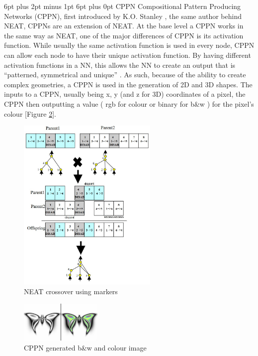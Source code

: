 \documentclass[12pt,a4paper]{article}
\makeatletter
\renewcommand\subsection{\@startsection {subsection}{1}{2mm} %
                               {6pt plus 2pt minus 1pt} %
                               {6pt plus 0pt} %
                               {\normalfont\bfseries}}
\makeatother
\begin{document}
\subsection{CPPN}
Compositional Pattern Producing Networks (CPPN), first introduced by K.O. Stanley \cite{stanley_compositional_2007}, the same author behind NEAT, CPPNs are an extension of NEAT. At the base level a CPPN works in the same way as NEAT, one of the major differences of CPPN is its activation function. While usually the same activation function is used in every node, CPPN can allow each node to have their unique activation function. By having different activation functions in a NN, this allows the NN to create an output that is “patterned, symmetrical and unique” \cite{wolfe_understanding_2018}. As such, because of the ability to create complex geometries, a CPPN is used in the generation of 2D and 3D shapes. The inputs to a CPPN, usually being x, y (and z for 3D) coordinates of a pixel, the CPPN then outputting a value (  rgb for colour or binary for b\&w ) for the pixel’s colour [Figure \ref{fig:7}].\par
\begin{figure}[h]
	\includegraphics[width=0.6\textwidth]{neat2}
	\centering
	\caption{NEAT crossover using markers \protect \cite{stanley_evolving_2002}}
	\label{fig:6}
\end{figure}
\begin{figure}[h]
	\includegraphics[width=0.35\textwidth]{1035}
	\centering
	\caption{CPPN generated b\&w  and colour image \protect \cite{noauthor_picbreeder_noyear}}
	\label{fig:7}
\end{figure}
\end{document}
